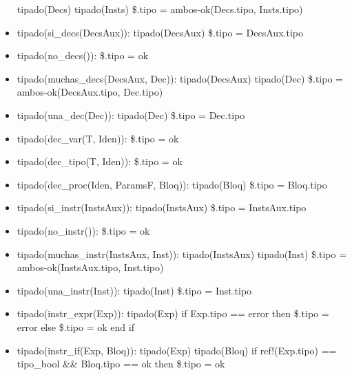 \documentclass[11pt]{article}
\begin{document}
\begin{itemize}
                \subitem tipado(Decs)
                \subitem tipado(Insts)
                \subitem \$.tipo = ambos-ok(Decs.tipo, Insts.tipo)
            \item tipado(si\_decs(DecsAux)): 
                \subitem tipado(DecsAux)
                \subitem \$.tipo = DecsAux.tipo
            \item tipado(no\_decs()): 
                \subitem \$.tipo = ok
            \item tipado(muchas\_decs(DecsAux, Dec)): 
                \subitem tipado(DecsAux)
                \subitem tipado(Dec)
                \subitem \$.tipo = ambos-ok(DecsAux.tipo, Dec.tipo)
            \item tipado(una\_dec(Dec)): 
                \subitem tipado(Dec)
                \subitem \$.tipo = Dec.tipo
            \item tipado(dec\_var(T, Iden)): 
                \subitem \$.tipo = ok
            \item tipado(dec\_tipo(T, Iden)): 
                \subitem \$.tipo = ok
            \item tipado(dec\_proc(Iden, ParamsF, Bloq)): 
                \subitem tipado(Bloq)
                \subitem \$.tipo = Bloq.tipo
            \item tipado(si\_instr(InstsAux)): 
                \subitem tipado(InstsAux)
                \subitem \$.tipo = InstsAux.tipo
            \item tipado(no\_instr()): 
                \subitem \$.tipo = ok
            \item tipado(muchas\_instr(InstsAux, Inst)): 
                \subitem tipado(InstsAux)
                \subitem tipado(Inst)
                \subitem \$.tipo = ambos-ok(InstsAux.tipo, Inst.tipo)
            \item tipado(una\_instr(Inst)): 
                \subitem tipado(Inst)
                \subitem \$.tipo = Inst.tipo
            \item tipado(instr\_expr(Exp)): 
                \subitem tipado(Exp)
                \subitem if Exp.tipo == error then
                    \subsubitem \$.tipo = error
                \subitem else
                    \subsubitem \$.tipo = ok
                \subitem end if
            \item tipado(instr\_if(Exp, Bloq)): 
                \subitem tipado(Exp)
                \subitem tipado(Bloq)
                \subitem if ref!(Exp.tipo) == tipo\_bool \&\& Bloq.tipo == ok then
                    \subsubitem \$.tipo = ok

\end{itemize}
\end{document}
